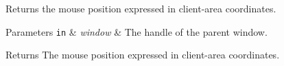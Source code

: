 Returns the mouse position expressed in client-\/area coordinates.


\begin{DoxyParams}[1]{Parameters}
\mbox{\tt in}  & {\em window} & The handle of the parent window. \\
\hline
\end{DoxyParams}
\begin{DoxyReturn}{Returns}
The mouse position expressed in client-\/area coordinates. 
\end{DoxyReturn}
